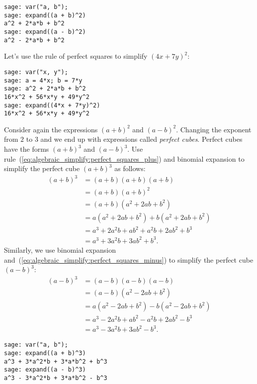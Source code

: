 \begin{lstlisting}
sage: var("a, b");
sage: expand((a + b)^2)
a^2 + 2*a*b + b^2
sage: expand((a - b)^2)
a^2 - 2*a*b + b^2
\end{lstlisting}

Let's use the rule of perfect squares to simplify $(4x + 7y)^2$:

\begin{lstlisting}
sage: var("x, y");
sage: a = 4*x; b = 7*y
sage: a^2 + 2*a*b + b^2
16*x^2 + 56*x*y + 49*y^2
sage: expand((4*x + 7*y)^2)
16*x^2 + 56*x*y + 49*y^2
\end{lstlisting}

Consider again the expressions $(a + b)^2$ and $(a - b)^2$. Changing
the exponent from $2$ to $3$ and we end up with expressions called
\emph{perfect cubes}. Perfect cubes have the
forms $(a + b)^3$ and $(a - b)^3$. Use
rule~(\ref{eq:algebraic_simplify:perfect_squares_plus}) and binomial
expansion to simplify the perfect cube $(a + b)^3$ as follows:
%
\begin{equation}
\label{eq:algebraic_simplify:perfect_cubes_plus}
\begin{aligned}
(a + b)^3
&=
(a + b)(a + b)(a + b) \\
&=
(a + b)(a + b)^2 \\
&=
(a + b)(a^2 + 2ab + b^2) \\
&=
a(a^2 + 2ab + b^2) + b(a^2 + 2ab + b^2) \\
&=
a^3 + 2a^2b + ab^2 + a^2b + 2ab^2 + b^3 \\
&=
a^3 + 3a^2b + 3ab^2 + b^3.
\end{aligned}
\end{equation}
%
Similarly, we use binomial expansion
and~(\ref{eq:algebraic_simplify:perfect_squares_minus}) to simplify
the perfect cube $(a - b)^3$:
%
\begin{equation}
\label{eq:algebraic_simplify:perfect_cubes_minus}
\begin{aligned}
(a - b)^3
&=
(a - b)(a - b)(a - b) \\
&=
(a - b)(a^2 - 2ab + b^2) \\
&=
a(a^2 - 2ab + b^2) - b(a^2 - 2ab + b^2) \\
&=
a^3 - 2a^2b + ab^2 - a^2b + 2ab^2 - b^3 \\
&=
a^3 - 3a^2b + 3ab^2 - b^3.
\end{aligned}
\end{equation}

\begin{lstlisting}
sage: var("a, b");
sage: expand((a + b)^3)
a^3 + 3*a^2*b + 3*a*b^2 + b^3
sage: expand((a - b)^3)
a^3 - 3*a^2*b + 3*a*b^2 - b^3
\end{lstlisting}

